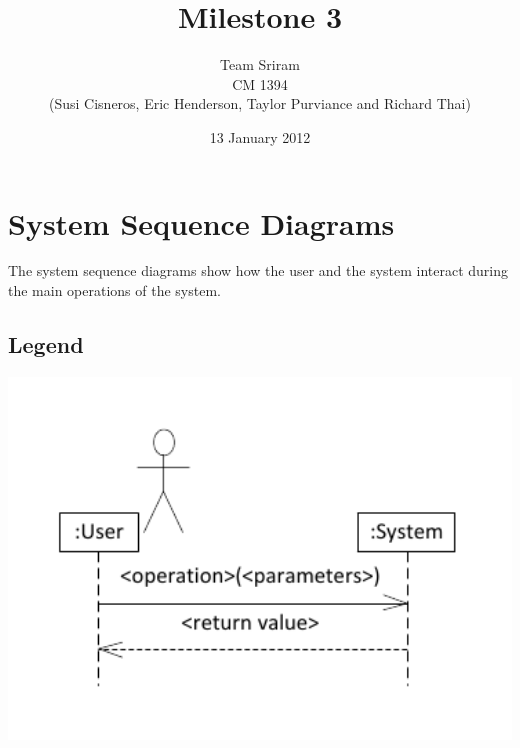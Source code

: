 \documentclass{article}
\begin{document}
\setlength{\voffset}{3.5in}
\title{Milestone 3}
\author{Team Sriram\\
CM 1394\\
(Susi Cisneros, Eric Henderson, Taylor Purviance and Richard Thai)}
\date{13 January 2012}
\maketitle
\clearpage
\setlength{\voffset}{0pt}
\tableofcontents
\clearpage
\section{System Sequence Diagrams}
The system sequence diagrams show how the user and the system interact during the main operations of the system.
\subsection{Legend}
\includegraphics[keepaspectratio, width=6in]{ssd_legend.pdf}\\
\end{document}

